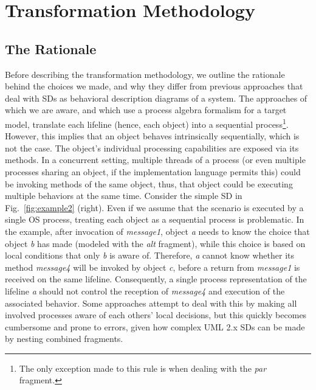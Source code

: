 \documentclass[letter]{llncs}
\newcommand{\figshrink}{\vspace{-.6cm}}
\newcommand{\figshrinkend}{}
\newcommand{\secshrinkbegin}{\vspace{-.2cm}}
\newcommand{\subsecshrinkbegin}{\vspace{-.2cm}}
\begin{document}
\section{Transformation Methodology}
\label{sec:Methodology}
\secshrinkbegin
\vspace{-3 pt}
\subsection{The Rationale}
\subsecshrinkbegin
\vspace{-2 pt}
Before describing the transformation methodology, we outline the rationale behind the choices we made, and why they differ from previous approaches
that deal with SDs as behavioral description diagrams of a system. 
The approaches of which we are aware, and which use a process algebra formalism for a target model, translate each lifeline (hence, each object) into a 
sequential process\footnote{The only exception made to this rule is when dealing with the \emph{par} fragment.}. However, this implies that an object 
behaves intrinsically sequentially, which is not the case. The object's individual processing capabilities are exposed via its methods. 
In a concurrent setting, multiple threads of a process (or even multiple processes sharing an object, if the implementation language permits this) 
could be invoking methods of the same object, thus, that object could be executing multiple behaviors at the same time.
Consider the simple SD in Fig.~\ref{fig:example2} (right). 
Even if we assume that the scenario is executed by a single OS process, treating 
each object as a sequential process is problematic. In the example, after invocation of \emph{message1}, object \emph{a}
needs to know the choice that object \emph{b} has made (modeled with the \emph{alt} fragment), while this choice is based on local conditions that only \emph{b} is aware of. Therefore, \emph{a}
cannot know whether its method \emph{message4} will be invoked by object \emph{c}, before a return from \emph{message1} is received on the same lifeline.
Consequently, a single process representation of the lifeline \emph{a} should not control the reception of \emph{message4} and execution of the associated behavior.
Some approaches attempt to deal with this by making all involved processes aware of each others' local decisions, but this quickly becomes cumbersome and prone to errors, given
how complex UML 2.x SDs can be made by nesting combined fragments.
\end{document}
